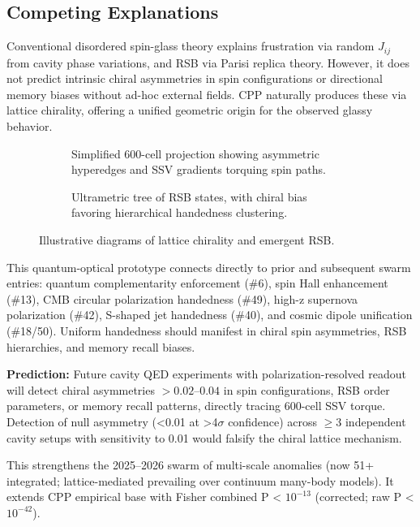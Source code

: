 \documentclass[11pt]{article}
\begin{document}
\subsection{Competing Explanations}
Conventional disordered spin-glass theory explains frustration via random $J_{ij}$ from cavity phase variations, and RSB via Parisi replica theory. However, it does not predict intrinsic chiral asymmetries in spin configurations or directional memory biases without ad-hoc external fields. CPP naturally produces these via lattice chirality, offering a unified geometric origin for the observed glassy behavior.

\begin{figure}[htbp]
\centering
\begin{subfigure}{0.45\textwidth}
\centering
\caption{Simplified 600-cell projection showing asymmetric hyperedges and SSV gradients torquing spin paths.}
\label{fig:600cell}
\end{subfigure}
\hfill
\begin{subfigure}{0.45\textwidth}
\centering
\caption{Ultrametric tree of RSB states, with chiral bias favoring hierarchical handedness clustering.}
\label{fig:rsb}
\end{subfigure}
\caption{Illustrative diagrams of lattice chirality and emergent RSB.}
\end{figure}

This quantum-optical prototype connects directly to prior and subsequent swarm entries: quantum complementarity enforcement (\#6), spin Hall enhancement (\#13), CMB circular polarization handedness (\#49), high-z supernova polarization (\#42), S-shaped jet handedness (\#40), and cosmic dipole unification (\#18/50). Uniform handedness should manifest in chiral spin asymmetries, RSB hierarchies, and memory recall biases.

\textbf{Prediction:} Future cavity QED experiments with polarization-resolved readout will detect chiral asymmetries $> 0.02$--$0.04$ in spin configurations, RSB order parameters, or memory recall patterns, directly tracing 600-cell SSV torque. Detection of null asymmetry (<0.01 at >4$\sigma$ confidence) across $\geq 3$ independent cavity setups with sensitivity to 0.01 would falsify the chiral lattice mechanism.

This strengthens the 2025--2026 swarm of multi-scale anomalies (now 51+ integrated; lattice-mediated prevailing over continuum many-body models). It extends CPP empirical base with Fisher combined P < $10^{-13}$ (corrected; raw P < $10^{-42}$).
\end{document}
